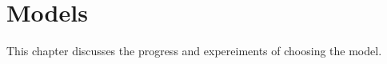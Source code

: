 \chapter{Models}
\label{chap:models}
This chapter discusses the progress and expereiments of choosing the model.

\begingroup
\let\clearpage\relax


% 
% 











\endgroup